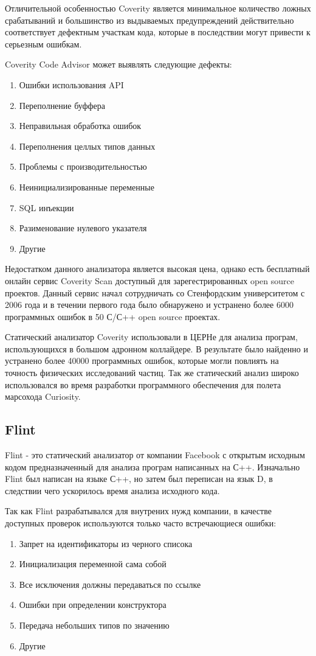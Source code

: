 Отличительной особенностью Coverity является минимальное количество ложных срабатываний и большинство 
из выдываемых предупреждений действительно соответствует дефектным участкам кода, которые в последствии могут
привести к серьезным ошибкам.

Coverity Code Advisor может выявлять следующие дефекты:
\begin{enumerate}
	\item Ошибки использования API
	\item Переполнение буффера
	\item Неправильная обработка ошибок
	\item Переполнения целлых типов данных
	\item Проблемы с производительностью
	\item Неинициализированные переменные
	\item SQL инъекции
	\item Разименование нулевого указателя
	\item Другие
\end{enumerate}
 
Недостатком данного анализатора является высокая цена, однако есть бесплатный онлайн сервис
Coverity Scan доступный для зарегестрированных open source проектов. Данный сервис начал сотрудничать
со Стенфордским университетом с 2006 года и в течении первого года было обнаружено и устранено
более 6000 программных ошибок в 50 С/С++ open source проектах. 

Статический анализатор Coverity использовали в ЦЕРНе для анализа програм, использующихся в 
большом адронном коллайдере. В результате было найденно и устранено более 40000 программных 
ошибок, которые могли повлиять на точность физических исследований частиц. Так же статический анализ
широко использовался во время разработки программного обеспечения для полета марсохода Curiosity.   
 
\subsection{Flint}
Flint - это статический анализатор от компании Facebook с открытым исходным кодом предназначенный 
для анализа програм написанных на С++. Изначально Flint был написан на языке С++, но затем 
был переписан на язык D, в следствии чего ускорилось время анализа исходного кода. 

Так как Flint разрабатывался для внутрених нужд компании, в качестве доступных проверок используются 
только часто встречающиеся ошибки:
\begin{enumerate}
	\item Запрет на идентификаторы из черного списока
	\item Инициализация переменной сама собой
	\item Все исключения должны передаваться по ссылке
	\item Ошибки при определении конструктора
	\item Передача небольших типов по значению
	\item Другие
\end{enumerate}

